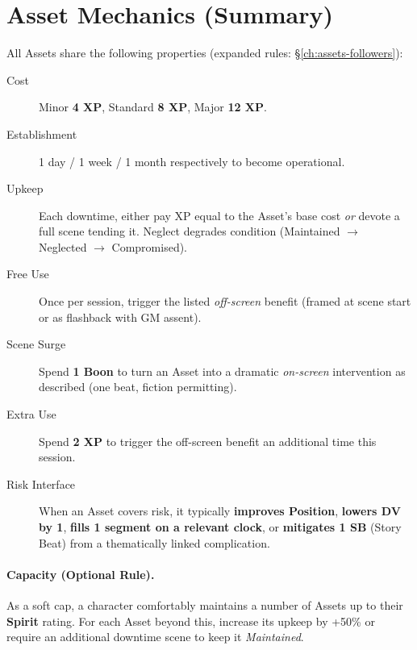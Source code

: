 \section{Asset Mechanics (Summary)}
All Assets share the following properties (expanded rules: \S\ref{ch:assets-followers}):
\begin{description}
  \item[Cost] Minor \textbf{4 XP}, Standard \textbf{8 XP}, Major \textbf{12 XP}. 
  \item[Establishment] 1 day / 1 week / 1 month respectively to become operational.
  \item[Upkeep] Each downtime, either pay XP equal to the Asset's base cost \emph{or} devote a full scene tending it. Neglect degrades condition (Maintained $\rightarrow$ Neglected $\rightarrow$ Compromised). 
  \item[Free Use] Once per session, trigger the listed \emph{off-screen} benefit (framed at scene start or as flashback with GM assent).
  \item[Scene Surge] Spend \textbf{1 Boon} to turn an Asset into a dramatic \emph{on-screen} intervention as described (one beat, fiction permitting). 
  \item[Extra Use] Spend \textbf{2 XP} to trigger the off-screen benefit an additional time this session.
  \item[Risk Interface] When an Asset covers risk, it typically \textbf{improves Position}, \textbf{lowers DV by 1}, \textbf{fills 1 segment on a relevant clock}, or \textbf{mitigates 1 SB} (Story Beat) from a thematically linked complication. 
\end{description}

\paragraph{Capacity (Optional Rule).}
As a soft cap, a character comfortably maintains a number of Assets up to their \textbf{Spirit} rating. For each Asset beyond this, increase its upkeep by +50\% or require an additional downtime scene to keep it \emph{Maintained}.

